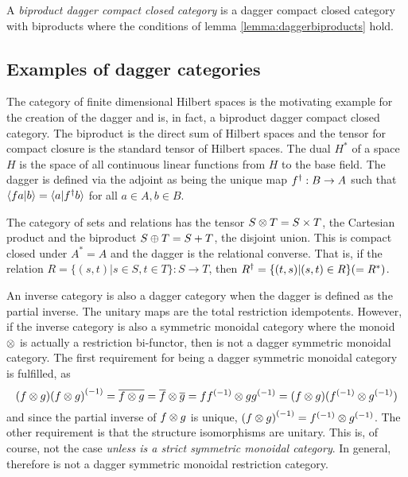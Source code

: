 \begin{definition} \label{def:biproductdaggerccc}
  A \emph{biproduct dagger compact closed category} is a dagger compact closed category with
  biproducts where the conditions of lemma \ref{lemma:daggerbiproducts} hold.
\end{definition}
\subsection{Examples of dagger categories}

\begin{example}[\fdh]\label{ex:fdhilbert_is_dagger_category}
The category of finite dimensional Hilbert spaces is the motivating example for
the creation of the dagger and is, in fact, a biproduct dagger compact closed category. The
biproduct is the direct sum of Hilbert spaces and the tensor for compact closure is the standard
tensor of Hilbert spaces. The dual $H^{*}$ of a space $H$ is the space of all continuous linear
functions from $H$ to the base field. The dagger is defined via the adjoint as being the unique map
${f}^{\dagger}:B\to A$ such that $\langle f a|b\rangle = \langle a | {f}^{\dagger} b\rangle$ for all $a\in A, b\in B$.
\end{example}

\begin{example}[\rel]\label{ex:rel_is_dagger_category}
The category \rel of sets and relations has the tensor $S\otimes T = S\times T$, the
Cartesian product and the biproduct $S\oplus T = S+T$, the disjoint union. This is compact closed under
$A^{*} = A$ and the dagger is the relational converse. That is, if the relation $R=\{(s,t)|s\in S,
t\in T\}:S\to T$, then ${R}^{\dagger}=\{(t,s)|(s,t)\in R\}(=R^{*})$.
\end{example}

\begin{example}\label{ex:inverse_category_is_dagger_category}
An inverse category \X is also a dagger category when the dagger is defined as the partial inverse.
The unitary maps are the total restriction idempotents. However, if the inverse category \X is also a
symmetric monoidal category where the monoid $\otimes$ is actually a restriction bi-functor, then \X is
not a dagger symmetric monoidal category. The first requirement for being a dagger symmetric
monoidal category is fulfilled, as
\[
  (f\otimes g) {(f\otimes g)}^{(-1)} = \overline{f\otimes g}=\overline{f} \otimes\overline{g} =
   f{f}^{(-1)} \otimes g {g}^{(-1)} = (f\otimes g) ({f}^{(-1)} \otimes {g}^{(-1)})
\]
and since the partial inverse of $f\otimes g$ is unique, ${(f\otimes g)}^{(-1)} = {f}^{(-1)} \otimes {g}^{(-1)}$. The other
requirement is that the structure isomorphisms are unitary. This is, of course, not the case
\emph{unless \X is a strict symmetric monoidal category}. In general,
therefore \X is not a dagger symmetric monoidal restriction category.
\end{example}
